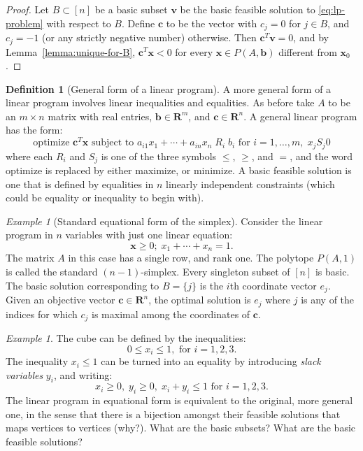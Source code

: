 \documentclass{amsbook}
\newcommand{\vv}{\mathbf v}
\newcommand{\xx}{\mathbf x}
\newcommand{\cc}{\mathbf c}
\newcommand{\bb}{\mathbf b}
\newcommand{\RR}{\mathbf R}
\theoremstyle{definition}
\newtheorem{definition}[theorem]{Definition}
\theoremstyle{remark}
\newtheorem{example}[theorem]{Example}
\begin{document}
\begin{proof}
  Let $B\subset [n]$ be a basic subset $\vv$ be the basic feasible solution to \eqref{eq:lp-problem} with respect to $B$.
  Define $\cc$ to be the vector with $c_j=0$ for $j\in B$, and $c_j=-1$ (or any strictly negative number) otherwise.
  Then $\cc^T\vv=0$, and by Lemma~\ref{lemma:unique-for-B}, $\cc^T\xx<0$ for every $\xx\in P(A,\bb)$ different from $\xx_0$.
\end{proof}
\begin{definition}
  [General form of a linear program]
  \label{example:glp}
  A more general form of a linear program involves linear inequalities and equalities.
  As before take $A$ to be an $m\times n$ matrix with real entries, $\bb\in \RR^m$, and $\cc\in \RR^n$.
  A general linear program has the form:
  \begin{equation}
    \label{eq:general-lp}
    \tag{GLP}
    \text{optimize $\cc^T\xx$ subject to }a_{i1}x_1+\dotsb + a_{in}x_n\; R_i\; b_i \text{ for }i=1,\dotsc,m,\; x_jS_j0
  \end{equation}
  where each $R_i$ and $S_j$ is one of the three symbols $\leq$, $\geq$, and $=$, and the word optimize is replaced by either maximize, or minimize.
  A basic feasible solution is one that is defined by equalities in $n$ linearly independent constraints (which could be equality or inequality to begin with).
\end{definition}
\begin{example}
  [Standard equational form of the simplex]
  Consider the linear program in $n$ variables with just one linear equation:
  \begin{displaymath}
    \xx\geq 0;\; x_1+\dotsb+x_n=1.
  \end{displaymath}
  The matrix $A$ in this case has a single row, and rank one.
  The polytope $P(A,1)$ is called the standard $(n-1)$-simplex.
  Every singleton subset of $[n]$ is basic.
  The basic solution corresponding to $B=\{j\}$ is the $i$th coordinate vector $e_j$.
  Given an objective vector $\cc\in \RR^n$, the optimal solution is $e_j$ where $j$ is any of the indices for which $c_j$ is maximal among the coordinates of $\cc$.
\end{example}
\begin{example}
  The cube can be defined by the inequalities:
  \begin{displaymath}
    0\leq x_i \leq 1, \text{ for } i=1,2,3.
  \end{displaymath}
  The inequality $x_i\leq 1$ can be turned into an equality by introducing \emph{slack variables} $y_i$, and writing:
  \begin{displaymath}
    x_i\geq 0,\;y_i\geq 0,\;x_i+y_i\leq 1 \text{ for }i=1,2,3.
  \end{displaymath}
  The linear program in equational form is equivalent to the original, more general one, in the sense that there is a bijection amongst their feasible solutions that maps vertices to vertices (why?).
  What are the basic subsets? What are the basic feasible solutions?
\end{example}
\end{document}
